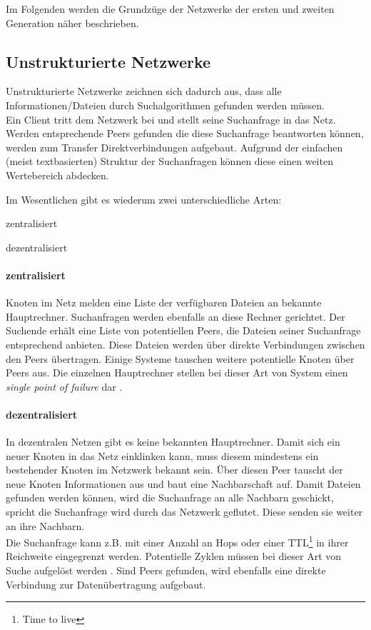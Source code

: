 Im Folgenden werden die Grundzüge der Netzwerke der ersten und zweiten Generation näher beschrieben.

\subsection{Unstrukturierte Netzwerke}
Unstrukturierte Netzwerke zeichnen sich dadurch aus, dass alle Informationen/Dateien durch Suchalgorithmen \cite{Lv2002} gefunden werden müssen. \\
Ein Client tritt dem Netzwerk bei und stellt seine Suchanfrage in das Netz. Werden entsprechende Peers gefunden die diese Suchanfrage beantworten können, werden zum Transfer Direktverbindungen aufgebaut. Aufgrund der einfachen (meist textbasierten) Struktur der Suchanfragen können diese einen weiten Wertebereich abdecken.

Im Wesentlichen gibt es wiederum zwei unterschiedliche Arten:
\begin{itemize*}
\item zentralisiert
\item dezentralisiert
\end{itemize*}

\paragraph{zentralisiert} Knoten im Netz melden eine Liste der verfügbaren Dateien an bekannte Hauptrechner. Suchanfragen werden ebenfalls an diese Rechner gerichtet. Der Suchende erhält eine Liste von potentiellen Peers, die Dateien seiner Suchanfrage entsprechend anbieten. Diese Dateien werden über direkte Verbindungen zwischen den Peers übertragen. Einige Systeme tauschen weitere potentielle Knoten über Peers aus. Die einzelnen Hauptrechner stellen bei dieser Art von System einen \emph{single point of failure} dar \cite{Eberspaecher2005}.

\paragraph{dezentralisiert} In dezentralen Netzen gibt es keine bekannten Hauptrechner. Damit sich ein neuer Knoten in das Netz einklinken kann, muss diesem mindestens ein bestehender Knoten im Netzwerk bekannt sein. Über diesen Peer tauscht der neue Knoten Informationen aus und baut eine Nachbarschaft auf. Damit Dateien gefunden werden können, wird die Suchanfrage an alle Nachbarn geschickt, spricht die Suchanfrage wird durch das Netzwerk geflutet. Diese senden sie weiter an ihre Nachbarn.\\
Die Suchanfrage kann z.B. mit einer Anzahl an Hops oder einer TTL\footnote{Time to live} in ihrer Reichweite eingegrenzt werden. Potentielle Zyklen müssen bei dieser Art von Suche aufgelöst werden \cite{Lv2002}. Sind Peers gefunden, wird ebenfalls eine direkte Verbindung zur Datenübertragung aufgebaut. 

